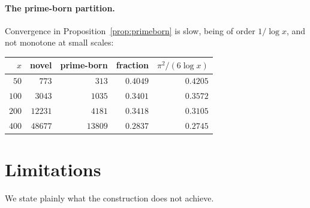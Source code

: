 \documentclass[11pt,a4paper]{article}
\theoremstyle{plain}
\theoremstyle{definition}
\theoremstyle{remark}
\begin{document}
\paragraph{The prime-born partition.} Convergence in
Proposition~\ref{prop:primeborn} is slow, being of order $1/\log x$, and not
monotone at small scales:

\begin{center}
\begin{tabular}{rrrrr}
\toprule
$x$ & novel & prime-born & fraction & $\pi^2/(6\log x)$ \\
\midrule
$50$  & $773$   & $313$   & $0.4049$ & $0.4205$ \\
$100$ & $3043$  & $1035$  & $0.3401$ & $0.3572$ \\
$200$ & $12231$ & $4181$  & $0.3418$ & $0.3105$ \\
$400$ & $48677$ & $13809$ & $0.2837$ & $0.2745$ \\
\bottomrule
\end{tabular}
\end{center}

\section{Limitations}
\label{sec:limits}

We state plainly what the construction does not achieve.
\end{document}

